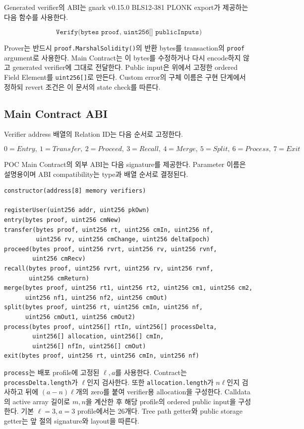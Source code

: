 \documentclass[11pt,a4paper]{extarticle}
\begin{document}
Generated verifier의 ABI는 gnark v0.15.0 BLS12-381 PLONK export가 제공하는 다음
함수를 사용한다.

\[
\texttt{Verify(bytes proof, uint256[] publicInputs)}
\]

Prover는 반드시 \texttt{proof.MarshalSolidity()}의 반환 bytes를 transaction의
\texttt{proof} argument로 사용한다. Main Contract는 이 bytes를 수정하거나 다시 encode하지
않고 generated verifier에 그대로 전달한다. Public input은 위에서 고정한 ordered Field
Element를 \texttt{uint256[]}로 만든다.
Custom error의 구체 이름은 구현 단계에서 정하되 revert 조건은 이 문서의 state check를 따른다.

\subsection{Main Contract ABI}

Verifier address 배열의 Relation ID는 다음 순서로 고정한다.

\[
0=Entry,\ 1=Transfer,\ 2=Proceed,\ 3=Recall,\
4=Merge,\ 5=Split,\ 6=Process,\ 7=Exit
\]

POC Main Contract의 외부 ABI는 다음 signature를 제공한다. Parameter 이름은 설명용이며
ABI compatibility는 type과 배열 순서로 결정된다.

\begin{verbatim}
constructor(address[8] memory verifiers)

registerUser(uint256 addr, uint256 pkOwn)
entry(bytes proof, uint256 cmNew)
transfer(bytes proof, uint256 rt, uint256 cmIn, uint256 nf,
         uint256 rv, uint256 cmChange, uint256 deltaEpoch)
proceed(bytes proof, uint256 rvrt, uint256 rv, uint256 rvnf,
        uint256 cmRecv)
recall(bytes proof, uint256 rvrt, uint256 rv, uint256 rvnf,
       uint256 cmReturn)
merge(bytes proof, uint256 rt1, uint256 rt2, uint256 cm1, uint256 cm2,
      uint256 nf1, uint256 nf2, uint256 cmOut)
split(bytes proof, uint256 rt, uint256 cmIn, uint256 nf,
      uint256 cmOut1, uint256 cmOut2)
process(bytes proof, uint256[] rtIn, uint256[] processDelta,
        uint256[] allocation, uint256[] cmIn,
        uint256[] nfIn, uint256[] cmOut)
exit(bytes proof, uint256 rt, uint256 cmIn, uint256 nf)
\end{verbatim}

\texttt{process}는 배포 profile에 고정된 $\ell,a$를 사용한다. Contract는
\texttt{processDelta.length}가 $\ell$인지 검사한다. 또한
\texttt{allocation.length}가 $n\ell$인지 검사하고 뒤에 $(a-n)\ell$개의 zero를 붙여
verifier용 allocation을 구성한다. Calldata의 active array 길이로
$m,n$을 계산한 후 해당 profile의 ordered public input을 구성한다. 기본
$\ell=3,a=3$ profile에서는 26개다. Tree path getter와 public storage getter는 앞 절의
signature와 layout을 따른다.
\end{document}
